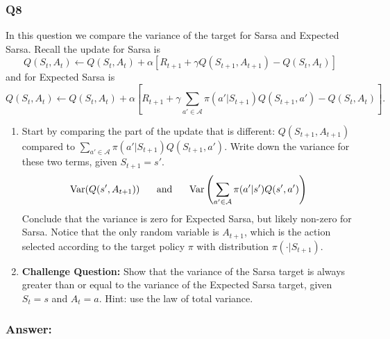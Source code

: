 \documentclass[a4paper, 10pt]{article}
\begin{document}
\subsubsection*{Q8}
In this question we compare the variance of the target for Sarsa and Expected Sarsa. Recall the update for Sarsa is 
$$ Q(S_{t}, A_{t}) \leftarrow Q(S_{t}, A_{t}) + \alpha \left[  R_{t+1} + \gamma Q(S_{t+1}, A_{t+1}) - Q(S_{t}, A_{t})\right]$$
and for Expected Sarsa is
$$ Q(S_{t}, A_{t}) \leftarrow Q(S_{t}, A_{t}) + \alpha \left[  R_{t+1} + \gamma \sum_{a' \in \mathcal{A}} \pi(a' | S_{t+1}) Q(S_{t+1}, a')  - Q(S_{t}, A_{t})\right].$$
\begin{enumerate}
\item Start by comparing the part of the update that is different: $Q(S_{t+1}, A_{t+1})$ compared to $\sum_{a' \in \mathcal{A}} \pi(a' | S_{t+1}) Q(S_{t+1}, a') $. Write down the variance for these two terms, given $S_{t+1} = s'$.
%
\begin{equation*}
\text{Var}(Q(s', A_{t+1})) \hspace{0.5cm} \text{ and }  \hspace{0.5cm}
\text{Var}\left(\sum_{a' \in \mathcal{A}} \pi(a' | s')Q(s', a')\right)
\end{equation*}
%
Conclude that the variance is zero for Expected Sarsa, but likely non-zero for Sarsa. Notice that the only random variable is $A_{t+1}$, which is the action selected according to the target policy $\pi$ with distribution $\pi(\cdot | S_{t+1})$. 
\item \textbf{Challenge Question:} Show that the variance of the Sarsa target is always greater than or equal to the variance of the Expected Sarsa target, given $S_t = s$ and $A_t = a$. Hint: use the law of total variance.
\end{enumerate}

\subsubsection*{Answer:}
\end{document}
